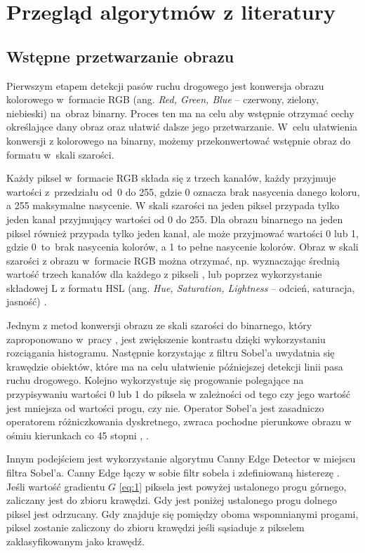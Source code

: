 \chapter{Przegląd algorytmów z literatury}

\section{Wstępne przetwarzanie obrazu}
Pierwszym etapem detekcji pasów ruchu drogowego jest konwersja obrazu kolorowego w~formacie RGB (ang. \textit{Red, Green, Blue} -- czerwony, zielony, niebieski) na~obraz binarny.
Proces ten ma na celu aby wstępnie otrzymać cechy określające dany obraz oraz ułatwić dalsze jego przetwarzanie. W~celu ułatwienia konwersji z kolorowego na binarny, możemy przekonwertować wstępnie obraz do formatu w~skali szarości. 

Każdy piksel w~formacie RGB składa się z trzech kanałów, każdy przyjmuje wartości z~przedziału od~0 do 255, gdzie 0 oznacza brak nasycenia danego koloru, a 255 maksymalne nasycenie.
W skali szarości na jeden piksel przypada tylko jeden kanał przyjmujący wartości od 0 do 255.
Dla obrazu binarnego na jeden piksel również przypada tylko jeden kanał, ale może przyjmować wartości 0 lub 1, gdzie 0~to~brak nasycenia kolorów, a 1 to pełne nasycenie kolorów.
Obraz w skali szarości z obrazu w~formacie RGB można otrzymać, np. wyznaczając średnią wartość trzech kanałów dla każdego z pikseli \cite{4}, lub poprzez wykorzystanie składowej L z formatu HSL (ang. \textit{Hue, Saturation, Lightness} -- odcień, saturacja, jasność) \cite{reichenbach_comparison}.


Jednym z metod konwersji obrazu ze skali szarości do binarnego, który zaproponowano w~pracy \cite{4}, jest zwiększenie kontrastu dzięki wykorzystaniu rozciągania histogramu. Następnie korzystając z filtru Sobel'a uwydatnia się krawędzie obiektów, które ma na celu ułatwienie późniejszej detekcji linii pasa ruchu drogowego. Kolejno wykorzystuje się progowanie polegające na przypisywaniu wartości 0 lub 1 do piksela w zależności od tego czy jego wartość jest mniejsza od wartości progu, czy nie. Operator Sobel'a jest zasadniczo operatorem różniczkowania dyskretnego, zwraca pochodne pierunkowe obrazu w ośmiu kierunkach co 45 stopni \cite{3}, \cite{sobel}.


Innym podejściem \cite{reichenbach_comparison} jest wykorzystanie algorytmu Canny Edge Detector w miejscu filtra Sobel'a. Canny Edge łączy w sobie filtr sobela i zdefiniowaną histerezę \cite{cany}. Jeśli wartość gradientu $G$ \eqref{eq:1} piksela jest powyżej ustalonego progu górnego, zaliczany jest do zbioru krawędzi. Gdy jest poniżej ustalonego progu dolnego piksel jest odrzucany. Gdy znajduje się pomiędzy oboma wspomnianymi progami, piksel zostanie zaliczony do zbioru krawędzi jeśli sąsiaduje z pikselem zaklasyfikowanym jako krawędź.

